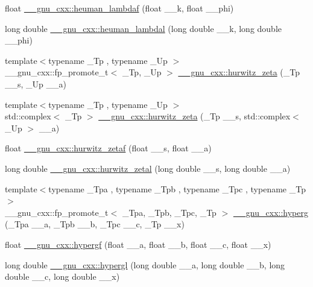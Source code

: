 \begin{DoxyCompactItemize}
\item 
float \hyperlink{group__gnu__math__spec__func_ga10cf5d54d985aa3a58cb197601040ac8}{\+\_\+\+\_\+gnu\+\_\+cxx\+::heuman\+\_\+lambdaf} (float \+\_\+\+\_\+k, float \+\_\+\+\_\+phi)
\item 
long double \hyperlink{group__gnu__math__spec__func_gadadaeb83b3d9c2fccd33ab8ec3188df5}{\+\_\+\+\_\+gnu\+\_\+cxx\+::heuman\+\_\+lambdal} (long double \+\_\+\+\_\+k, long double \+\_\+\+\_\+phi)
\item 
{\footnotesize template$<$typename \+\_\+\+Tp , typename \+\_\+\+Up $>$ }\\\+\_\+\+\_\+gnu\+\_\+cxx\+::fp\+\_\+promote\+\_\+t$<$ \+\_\+\+Tp, \+\_\+\+Up $>$ \hyperlink{group__gnu__math__spec__func_ga7b167ce1c8d9aa6aad40fc83a95733bd}{\+\_\+\+\_\+gnu\+\_\+cxx\+::hurwitz\+\_\+zeta} (\+\_\+\+Tp \+\_\+\+\_\+s, \+\_\+\+Up \+\_\+\+\_\+a)
\item 
{\footnotesize template$<$typename \+\_\+\+Tp , typename \+\_\+\+Up $>$ }\\std\+::complex$<$ \+\_\+\+Tp $>$ \hyperlink{group__gnu__math__spec__func_gaa7f0d1fbba9d2ce07a30d907302d527f}{\+\_\+\+\_\+gnu\+\_\+cxx\+::hurwitz\+\_\+zeta} (\+\_\+\+Tp \+\_\+\+\_\+s, std\+::complex$<$ \+\_\+\+Up $>$ \+\_\+\+\_\+a)
\item 
float \hyperlink{group__gnu__math__spec__func_gaa745d7f2edde060ed2f22817ad89df1f}{\+\_\+\+\_\+gnu\+\_\+cxx\+::hurwitz\+\_\+zetaf} (float \+\_\+\+\_\+s, float \+\_\+\+\_\+a)
\item 
long double \hyperlink{group__gnu__math__spec__func_gad8f2cfc7e198755968bae35d46b49d5a}{\+\_\+\+\_\+gnu\+\_\+cxx\+::hurwitz\+\_\+zetal} (long double \+\_\+\+\_\+s, long double \+\_\+\+\_\+a)
\item 
{\footnotesize template$<$typename \+\_\+\+Tpa , typename \+\_\+\+Tpb , typename \+\_\+\+Tpc , typename \+\_\+\+Tp $>$ }\\\+\_\+\+\_\+gnu\+\_\+cxx\+::fp\+\_\+promote\+\_\+t$<$ \+\_\+\+Tpa, \+\_\+\+Tpb, \+\_\+\+Tpc, \+\_\+\+Tp $>$ \hyperlink{group__gnu__math__spec__func_ga374198e4076f9e23f3878ca3af70e6da}{\+\_\+\+\_\+gnu\+\_\+cxx\+::hyperg} (\+\_\+\+Tpa \+\_\+\+\_\+a, \+\_\+\+Tpb \+\_\+\+\_\+b, \+\_\+\+Tpc \+\_\+\+\_\+c, \+\_\+\+Tp \+\_\+\+\_\+x)
\item 
float \hyperlink{group__gnu__math__spec__func_gac4c81e4ea9cef149fe40291ca10d7e15}{\+\_\+\+\_\+gnu\+\_\+cxx\+::hypergf} (float \+\_\+\+\_\+a, float \+\_\+\+\_\+b, float \+\_\+\+\_\+c, float \+\_\+\+\_\+x)
\item 
long double \hyperlink{group__gnu__math__spec__func_ga9961967087216e97f76283f29e1be152}{\+\_\+\+\_\+gnu\+\_\+cxx\+::hypergl} (long double \+\_\+\+\_\+a, long double \+\_\+\+\_\+b, long double \+\_\+\+\_\+c, long double \+\_\+\+\_\+x)

\end{DoxyCompactItemize}
